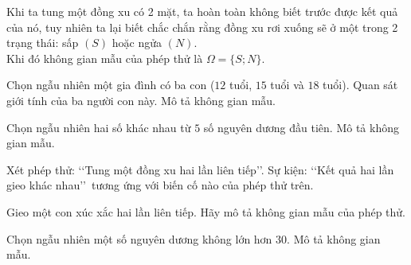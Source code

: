 
\begin{bt}%
	Khi ta tung  một đồng xu có 2 mặt, ta hoàn toàn không biết trước được kết quả của nó, tuy nhiên ta lại biết chắc chắn rằng đồng xu rơi xuống sẽ ở một trong 2 trạng thái: sấp $(S)$ hoặc ngửa $(N)$.\\
	Khi đó không  gian mẫu của phép thử là $\Omega=\{S; N\}$.
\end{bt}

\begin{bt}%
	Chọn ngẫu nhiên một gia đình có ba con ($12$ tuổi, $15$  tuổi và $18$ tuổi). Quan sát giới tính của ba người con này. Mô tả không gian mẫu.
\end{bt}

\begin{bt}%
	Chọn ngẫu nhiên hai số khác nhau từ $5$  số nguyên dương đầu tiên. Mô tả không gian mẫu.
\end{bt}

\begin{bt}%
	Xét phép thử:  \lq\lq Tung một đồng xu hai lần liên tiếp\rq\rq. Sự kiện: \lq\lq Kết quả hai lần gieo khác nhau\rq\rq\ tương ứng với biến cố nào của phép thử trên.\\
\end{bt}

\begin{bt}%
	Gieo  một con xúc xắc hai lần liên tiếp. Hãy mô tả không gian mẫu của phép thử.\\
\end{bt}

\begin{bt}%
	Chọn ngẫu nhiên một số nguyên dương không lớn  hơn $30$. Mô tả không gian mẫu.
\end{bt}


